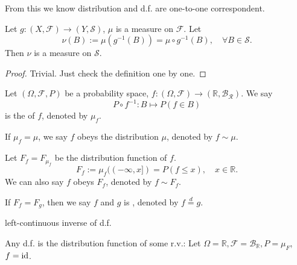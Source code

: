 From this we know distribution and d.f. are one-to-one correspondent.

\begin{theorem}
    Let $g: (X,\mathscr{F})\to (Y, \mathscr{S})$, $\mu$ is a measure on $ \mathscr{F}$.
	Let
	\[
	\nu(B):=\mu(g^{-1}(B)) = \mu\circ g^{-1}(B),\quad \forall B\in \mathscr{S}.
	\]
	Then  $\nu$ is a measure on $\mathscr{S}$.
\end{theorem}
\begin{proof}[Proof]
    Trivial. Just check the definition one by one.
\end{proof}

Let $(\Omega, \mathscr{F}, P)$ be a probability space, $f:(\Omega, \mathscr{F})
\to (\mathbb{R}, \mathscr{B}_{\mathscr{R}})$. We say
\[
P\circ f^{-1} : B\mapsto P(f\in B)
\]
is the  of $f$, denoted by $\mu_f$.

If $\mu_f = \mu$, we say $f$ obeys the distribution $\mu$, denoted by
$f\sim \mu$. 

Let $F_f = F_{\mu_f}$ be the distribution function of $f$.
 \[
	 F_f := \mu_f ((-\infty,x]) = P(f\le x),\quad x\in \mathbb{R}.
\]
We can also say $f$ obeys $F_f$, denoted by $f\sim F_f$.

If $F_f = F_g$, then we say $f$ and $g$ is ,
denoted by  $f \overset{d}{=} g$. 

left-continuous inverse of d.f.

Any d.f. is the distribution function of some r.v.:
Let $\Omega = \mathbb{R}, \mathscr{F} = \mathscr{B}_{\mathbb{R}}, P=\mu_F$,
$f = \operatorname{id}$.
